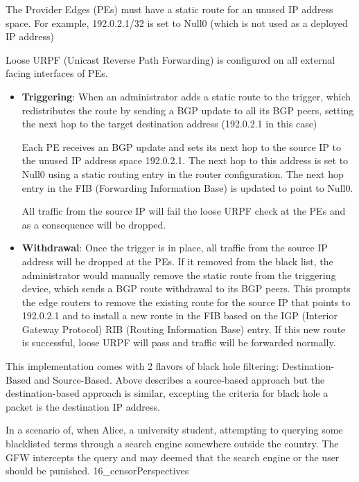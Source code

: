 \documentclass[nonacm,sigplan,screen]{acmart}
\begin{document}
The Provider Edges (PEs) must have a static route for an unused IP
address space. For example, 192.0.2.1/32 is set to Null0 (which is not
used as a deployed IP address)

Loose URPF (Unicast Reverse Path Forwarding) is configured on all
external facing interfaces of PEs.

\begin{itemize}
\item
  \textbf{Triggering}: When an administrator adds a static route to the
  trigger, which redistributes the route by sending a BGP update to all
  its BGP peers, setting the next hop to the target destination address
  (192.0.2.1 in this case)

  Each PE receives an BGP update and sets its next hop to the source IP
  to the unused IP address space 192.0.2.1. The next hop to this address
  is set to Null0 using a static routing entry in the router
  configuration. The next hop entry in the FIB (Forwarding Information
  Base) is updated to point to Null0.

  All traffic from the source IP will fail the loose URPF check at the
  PEs and as a consequence will be dropped.
\item
  \textbf{Withdrawal}: Once the trigger is in place, all traffic from
  the source IP address will be dropped at the PEs. If it removed from
  the black list, the administrator would manually remove the static
  route from the triggering device, which sends a BGP route withdrawal
  to its BGP peers. This prompts the edge routers to remove the existing
  route for the source IP that points to 192.0.2.1 and to install a new
  route in the FIB based on the IGP (Interior Gateway Protocol) RIB
  (Routing Information Base) entry. If this new route is successful,
  loose URPF will pass and traffic will be forwarded normally.
\end{itemize}

This implementation comes with 2 flavors of black hole filtering:
Destination-Based and Source-Based. Above describes a source-based
approach but the destination-based approach is similar, excepting the
criteria for black hole a packet is the destination IP address.

In a scenario of, when Alice, a university student, attempting to
querying some blacklisted terms through a search engine somewhere
outside the country. The GFW intercepts the query and may deemed that
the search engine or the user should be punished. 16\_censorPerspectives
\end{document}
